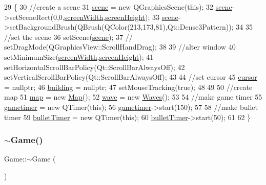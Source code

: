 \begin{DoxyCode}
29 \{
30     \textcolor{comment}{//create a scene}
31     \hyperlink{class_game_a8119e3b9a632906c6808fa294b46a92a}{scene} = \textcolor{keyword}{new} QGraphicsScene(\textcolor{keyword}{this});
32     \hyperlink{class_game_a8119e3b9a632906c6808fa294b46a92a}{scene}->setSceneRect(0,0,\hyperlink{class_game_ab1ca40d8527bb09e773bb97030b7a5cc}{screenWidth},\hyperlink{class_game_a329351d67993953391a6a65db536c017}{screenHeight});
33     \hyperlink{class_game_a8119e3b9a632906c6808fa294b46a92a}{scene}->setBackgroundBrush(QBrush(QColor(213,173,81),Qt::Dense3Pattern));
34 
35     \textcolor{comment}{//set the scene}
36     setScene(\hyperlink{class_game_a8119e3b9a632906c6808fa294b46a92a}{scene});
37 \textcolor{comment}{//    setDragMode(QGraphicsView::ScrollHandDrag);}
38 
39     \textcolor{comment}{//alter window}
40     setMinimumSize(\hyperlink{class_game_ab1ca40d8527bb09e773bb97030b7a5cc}{screenWidth},\hyperlink{class_game_a329351d67993953391a6a65db536c017}{screenHeight});
41     setHorizontalScrollBarPolicy(Qt::ScrollBarAlwaysOff);
42     setVerticalScrollBarPolicy(Qt::ScrollBarAlwaysOff);
43 
44     \textcolor{comment}{//set cursor}
45     \hyperlink{class_game_ac8bde3bd16f503846f66bbb866c3b7b9}{cursor} = \textcolor{keyword}{nullptr};
46     \hyperlink{class_game_a5917b4e021a93be7666ebc2ef4529401}{building} = \textcolor{keyword}{nullptr};
47     setMouseTracking(\textcolor{keyword}{true});
48 
49 
50     \textcolor{comment}{//create map}
51     \hyperlink{class_game_acef3a39fdf14be2c980b0dc11e7be402}{map} = \textcolor{keyword}{new} \hyperlink{class_map}{Map}();
52     \hyperlink{class_game_af9a4b49ad573785e961b29758c84fdd0}{wave} = \textcolor{keyword}{new} \hyperlink{class_waves}{Waves}();
53 
54     \textcolor{comment}{//make game timer}
55     \hyperlink{class_game_a8feee9081542b15a9f2d889a6f1c8257}{gametimer} = \textcolor{keyword}{new} QTimer(\textcolor{keyword}{this});
56     \hyperlink{class_game_a8feee9081542b15a9f2d889a6f1c8257}{gametimer}->start(150);
57 
58     \textcolor{comment}{//make bullet timer}
59     \hyperlink{class_game_a4774e6e02e372dabcba313802800df5d}{bulletTimer} = \textcolor{keyword}{new} QTimer(\textcolor{keyword}{this});
60     \hyperlink{class_game_a4774e6e02e372dabcba313802800df5d}{bulletTimer}->start(50);
61 
62 \}
\end{DoxyCode}
\mbox{\label{class_game_ae3d112ca6e0e55150d2fdbc704474530}} 
\subsubsection{\texorpdfstring{$\sim$\+Game()}{~Game()}}
{\footnotesize\ttfamily Game\+::$\sim$\+Game (\begin{DoxyParamCaption}{ }\end{DoxyParamCaption})}



